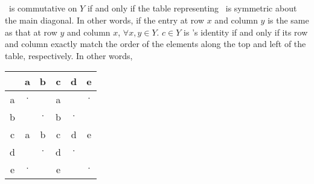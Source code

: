 \documentclass{article}
\begin{document}
\subsection{} %
\heart\, is commutative on $Y$ if and only if the table representing \heart\, is
symmetric about the main diagonal. In other words, if the entry at row $x$ and
column $y$ is the same as that at row $y$ and column $x$, $\forall x,y\in Y$.
\newline
\newline
$c\in Y$ is \heart's identity if and only if its row and column exactly match
the order of the elements along the top and left of the table, respectively. In
other words,
\newline
\newline
\begin{tabular}{c|ccccc}
	\heart & a & b & c & d & e \\
	\hline
	a & $\boldsymbol\cdot$ && a && $\boldsymbol\cdot$  \\
	b && $\boldsymbol\cdot$ & b & $\boldsymbol\cdot$ & \\
	c & a & b & c &d & e \\
	d && $\boldsymbol\cdot$ & d & $\boldsymbol\cdot$ & \\
	e & $\boldsymbol\cdot$ && e && $\boldsymbol\cdot$ \\
\end{tabular}
\end{document}
